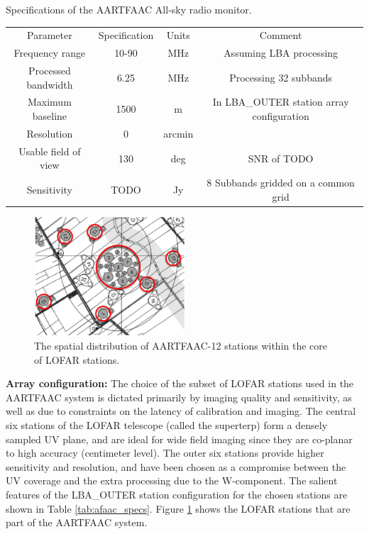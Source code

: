 \documentclass{ws-jai}
\begin{document}
\begin{wstable}[h]
\caption{Specifications of the AARTFAAC All-sky radio monitor.}
\begin{tabular}{@{}cccc@{}} \toprule
Parameter & Specification & Units & Comment\\ \colrule
Frequency range & 10-90 & MHz & Assuming LBA processing  \\
Processed bandwidth & 6.25 & MHz & Processing 32 subbands \\
Maximum baseline & 1500 & m & In LBA\_OUTER station array configuration\\
Resolution & 0 & arcmin & \\
Usable field of view & 130 & deg & SNR of TODO \\
Sensitivity & TODO & Jy & 8 Subbands gridded on a common grid \\

\end{tabular}
\label{tab:afaac_specs}
\end{wstable}

\begin{figure}[htbp]
\includegraphics[width=0.5\textwidth]{Figs/afaac12_arrayconfig.png}
\caption{The spatial distribution of AARTFAAC-12 stations within the core of LOFAR stations.}
\label{fig:afaac12_arrayconfig}
\end{figure}

\noindent  \textbf {Array  configuration:} The  choice  of the  subset of  LOFAR
stations used  in the AARTFAAC system  is dictated primarily by  imaging quality
and sensitivity, as well as due to constraints on the latency of calibration and
imaging. The central six stations of  the LOFAR telescope (called the superterp)
form a densely sampled UV plane, and are ideal for wide field imaging since they
are  co-planar to  high accuracy  (centimeter  level).  The  outer six  stations
provide higher sensitivity and resolution, and  have been chosen as a compromise
between the  UV coverage and the  extra processing due to  the W-component.  The
salient features of the LBA\_OUTER station configuration for the chosen stations
are     shown     in           Table     \ref{tab:afaac_specs}.      Figure
\ref{fig:afaac12_arrayconfig}  shows the  LOFAR stations  that are  part of  the
AARTFAAC system.
\end{document}
